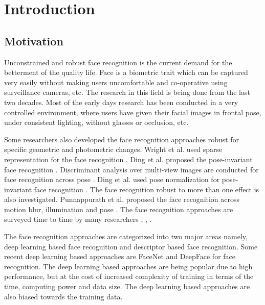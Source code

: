 \documentclass[a4paper]{article}
\begin{document}

\section{Introduction}
\subsection{Motivation}
Unconstrained and robust face recognition is the current demand for the betterment of the quality life. Face is a biometric trait which can be captured very easily without making users uncomfortable and co-operative using surveillance cameras, etc. The research in this field is being done from the last two decades. Most of the early days research has been conducted in a very controlled environment, where users have given their facial images in frontal pose, under consistent lighting, without glasses or occlusion, etc. 

Some researchers also developed the face recognition approaches robust for specific geometric and photometric changes. Wright et al. used sparse representation for the face recognition \cite{wright2009}. Ding et al. proposed the pose-invariant face recognition \cite{ding2015multi}. Discriminant analysis over multi-view images are conducted for face recognition across pose \cite{kan2016multi}. Ding et al. used pose normalization for pose-invariant face recognition \cite{ding2012}. The face recognition robust to more than one effect is also investigated. Punnappurath et al. proposed the face recognition across motion blur, illumination and pose \cite{abhi2015}. The face recognition approaches are surveyed time to time by many researchers \cite{zhao2003face}, \cite{zhang2009face}, \cite{ding2016comprehensive}. 

The face recognition approaches are categorized into two major areas namely, deep learning based face recognition and descriptor based face recognition. Some recent deep learning based approaches are FaceNet \cite{facenet} and DeepFace \cite{deepface} for face recognition. The deep learning based approaches are being popular due to high performance, but at the cost of increased complexity of training in terms of the time, computing power and data size. The deep learning based approaches are also biased towards the training data.
\end{document}
